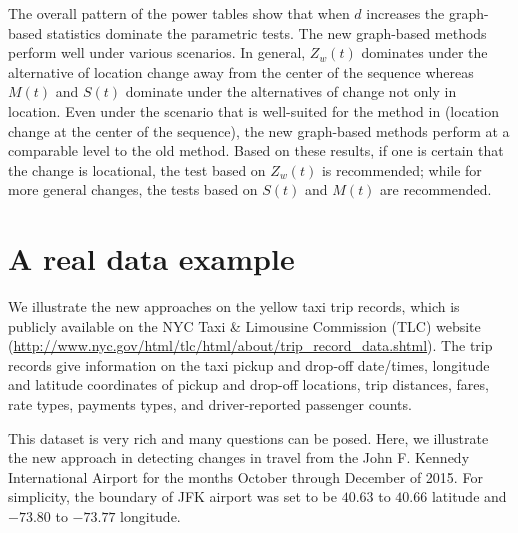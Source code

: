 \documentclass[arxiv, preprint]{imsart}
\numberwithin{equation}{section}
\theoremstyle{plain}
\begin{document}

The overall pattern of the power tables show that when $d$ increases the graph-based statistics dominate the parametric tests. The new graph-based methods perform well under various scenarios. In general, $Z_w(t)$ dominates under the alternative of location change away from the center of the sequence whereas $M(t)$ and $S(t)$ dominate under the alternatives of change not only in location. Even under the scenario that is well-suited for the method in \cite{chen2015graph} (location change at the center of the sequence), the new graph-based methods perform at a comparable level to the old method.   Based on these results, if one is certain that the change is locational, the test based on $Z_w(t)$ is recommended; while for more general changes, the tests based on $S(t)$ and $M(t)$ are recommended. 

 
\section{A real data example}
\label{sec:6}
We illustrate the new approaches on the yellow taxi trip records, which is publicly available on the NYC Taxi \& Limousine Commission (TLC) website (\url{http://www.nyc.gov/html/tlc/html/about/trip_record_data.shtml}). The trip records give information on the taxi pickup and drop-off date/times, longitude and latitude coordinates of pickup and drop-off locations, trip distances, fares, rate types, payments types, and driver-reported passenger counts. 

This dataset is very rich and many questions can be posed. Here, we illustrate the new approach in detecting changes in travel from the John F. Kennedy International Airport for the months October through December of 2015. For simplicity, the boundary of JFK airport was set to be $40.63$ to $40.66$ latitude and $-73.80$ to $-73.77$ longitude. 
\end{document}
